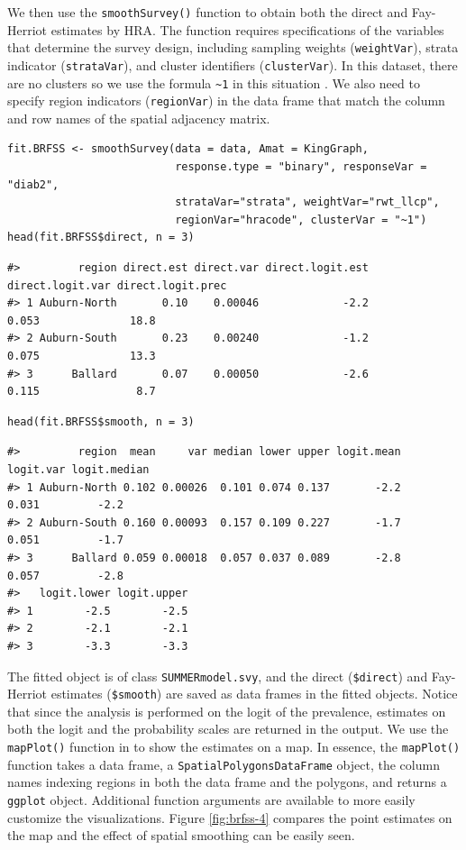 We then use the \texttt{smoothSurvey()} function to obtain both the direct and Fay-Herriot estimates by HRA. The function requires specifications of the variables that determine the survey design, including sampling weights (\texttt{weightVar}), strata indicator (\texttt{strataVar}), and cluster identifiers (\texttt{clusterVar}). In this dataset, there are no clusters so we use the formula \texttt{\textasciitilde{}1} in this situation \citep{lumley2004analysis}. We also need to specify region indicators (\texttt{regionVar}) in the data frame that match the column and row names of the spatial adjacency matrix.

\begin{verbatim}
fit.BRFSS <- smoothSurvey(data = data, Amat = KingGraph, 
                          response.type = "binary", responseVar = "diab2", 
                          strataVar="strata", weightVar="rwt_llcp", 
                          regionVar="hracode", clusterVar = "~1")
head(fit.BRFSS$direct, n = 3)
\end{verbatim}

\begin{verbatim}
#>         region direct.est direct.var direct.logit.est direct.logit.var direct.logit.prec
#> 1 Auburn-North       0.10    0.00046             -2.2            0.053              18.8
#> 2 Auburn-South       0.23    0.00240             -1.2            0.075              13.3
#> 3      Ballard       0.07    0.00050             -2.6            0.115               8.7
\end{verbatim}

\begin{verbatim}
head(fit.BRFSS$smooth, n = 3)
\end{verbatim}

\begin{verbatim}
#>         region  mean     var median lower upper logit.mean logit.var logit.median
#> 1 Auburn-North 0.102 0.00026  0.101 0.074 0.137       -2.2     0.031         -2.2
#> 2 Auburn-South 0.160 0.00093  0.157 0.109 0.227       -1.7     0.051         -1.7
#> 3      Ballard 0.059 0.00018  0.057 0.037 0.089       -2.8     0.057         -2.8
#>   logit.lower logit.upper
#> 1        -2.5        -2.5
#> 2        -2.1        -2.1
#> 3        -3.3        -3.3
\end{verbatim}

The fitted object is of class \texttt{SUMMERmodel.svy}, and the direct (\texttt{\$direct}) and Fay-Herriot estimates (\texttt{\$smooth}) are saved as data frames in the fitted objects. Notice that since the analysis is performed on the logit of the prevalence, estimates on both the logit and the probability scales are returned in the output. We use the \texttt{mapPlot()} function in  to show the estimates on a map. In essence, the \texttt{mapPlot()} function takes a data frame, a \texttt{SpatialPolygonsDataFrame} object, the column names indexing regions in both the data frame and the polygons, and returns a \texttt{ggplot} object. Additional function arguments are available to more easily customize the visualizations. Figure \ref{fig:brfss-4} compares the point estimates on the map and the effect of spatial smoothing can be easily seen.

